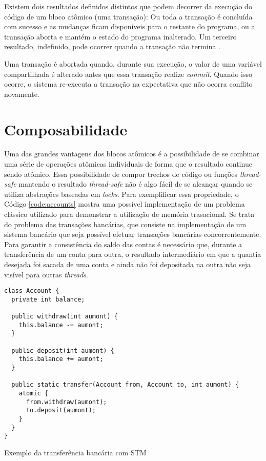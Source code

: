 Existem dois resultados definidos distintos que podem decorrer da execução do código de um bloco atômico (uma transação): Ou toda a transação é concluída com sucesso e as mudanças ficam disponíveis para o restante do programa, ou a transação aborta e mantém o estado do programa inalterado. Um terceiro resultado, indefinido, pode ocorrer quando a transação não termina \cite{helinefficiency}.

Uma transação é abortada quando, durante sua execução, o valor de uma variável compartilhada é alterado antes que essa transação realize \emph{commit}. Quando isso ocorre, o sistema re-executa a transação na expectativa que não ocorra conflito novamente.


\section{Composabilidade}

Uma das grandes vantagens dos blocos atômicos é a possibilidade de se combinar uma série de operações atômicas individuais de forma que o resultado continue sendo atômico. Essa possibilidade de compor trechos de código ou funções \emph{thread-safe} mantendo o resultado \emph{thread-safe} não é algo fácil de se alcançar quando se utiliza abstrações baseadas em \emph{locks}. Para exemplificar essa propriedade, o Código \ref{code:accounts} mostra uma possível implementação de um problema clássico utilizado para demonstrar a utilização de memória trasacional. Se trata do problema das transações bancárias, que consiste na implementação de um sistema bancário que seja possível efetuar transações bancárias concorrentemente. Para garantir a consistência do saldo das contas é necessário que, durante a transferência de um conta para outra, o resultado intermediário em que a quantia desejada foi sacada de uma conta e ainda não foi depositada na outra não seja visível para outras \emph{threads}.

\begin{listing}
  \begin{verbatim}
class Account {
  private int balance;
  
  public withdraw(int aumont) {
    this.balance -= aumont;
  }

  public deposit(int aumont) {
    this.balance += aumont;
  }

  public static transfer(Account from, Account to, int aumont) {
    atomic {
      from.withdraw(aumont);
      to.deposit(aumont);
    }
  }
}
  \end{verbatim}
  \caption{Exemplo da transferência bancária com STM}
  \label{code:accounts}
\end{listing}

